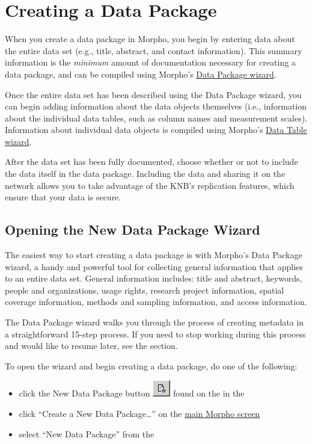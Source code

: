 \section{Creating a Data Package } \label{sec:creating}

When you create a data package in Morpho, you begin by entering data
about the entire data set (e.g., title, abstract, and contact
information). This summary information is the \emph{minimum} amount of
documentation necessary for creating a data package, and can be compiled
using Morpho's \hyperref[sec:wizard-newdp]{Data Package wizard}.

Once the entire data set has been described using the Data Package
wizard, you can begin adding information about the data objects
themselves (i.e., information about the individual data tables, such as
column names and measurement scales). Information about individual data
objects is compiled using Morpho's \hyperref[sec:wizard-newtable]{Data
Table wizard}. 

After the data set has been fully documented, choose whether or not to
include the data itself in the data package. Including the data and
sharing it on the network allows you to take advantage of the KNB's
replication features, which ensure that your data is secure.

\subsection{Opening the New Data Package Wizard} \label{sec:wizard-newdp}

The easiest way to start creating a data package is with Morpho's Data
Package wizard, a handy and powerful tool for collecting general
information that applies to an entire data set. General information
includes: title and abstract, keywords, people and organizations, usage
rights, research project information, spatial coverage information,
methods and sampling information, and access information. 

The Data Package wizard walks you through the process of creating
metadata in a straightforward 15-step process. If you need to stop
working during this process and would like to resume later, see the
 section.

To open the wizard and begin creating a data package, do one of the
following:
\begin{itemize}
  \setlength{\parskip}{1pt}
  \item click the New Data Package button
    \includegraphics[scale=0.7]{images/button-new-dp.png} found on the
    in the 
  \item click ``Create a New Data Package\ldots'' on the
    \hyperref[sec:panel-work]{main Morpho screen}
  \item select ``New Data Package'' from the 
\end{itemize}

